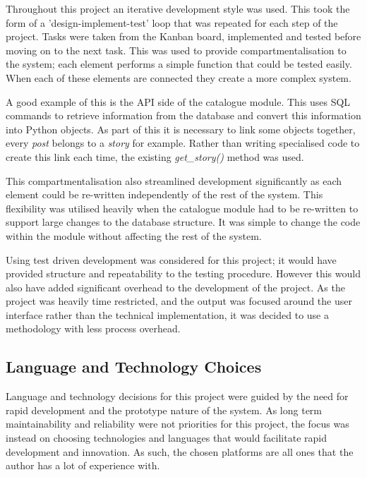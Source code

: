 \documentclass[12pt,titlepage]{article}
\begin{document}
  Throughout this project an iterative development style was used. This took the
  form of a 'design-implement-test' loop that was repeated for each step of the
  project. Tasks were taken from the Kanban board, implemented and tested before
  moving on to the next task. This was used to provide compartmentalisation to
  the system; each element performs a simple function that could be tested
  easily. When each of these elements are connected they create a more complex
  system.

  A good example of this is the API side of the catalogue module. This uses SQL
  commands to retrieve information from the database and convert this
  information into Python objects. As part of this it is necessary to link some
  objects together, every \textit{post} belongs to a \textit{story} for example.
  Rather than writing specialised code to create this link each time, the
  existing \textit{get\_story()} method was used.

  This compartmentalisation also streamlined development significantly as each
  element could be re-written independently of the rest of the system. This
  flexibility was utilised heavily when the catalogue module had to be
  re-written to support large changes to the database structure. It was simple
  to change the code within the module without affecting the rest of the system.

  Using test driven development was considered for this project; it would have
  provided structure and repeatability to the testing procedure. However this
  would also have added significant overhead to the development of the project.
  As the project was heavily time restricted, and the output was focused around
  the user interface rather than the technical implementation, it was decided to
  use a methodology with less process overhead.

  \subsection{Language and Technology Choices}

  Language and technology decisions for this project were guided by the need for
  rapid development and the prototype nature of the system. As long term
  maintainability and reliability were not priorities for this project, the
  focus was instead on choosing technologies and languages that would facilitate
  rapid development and innovation. As such, the chosen platforms are all ones
  that the author has a lot of experience with.
\end{document}
